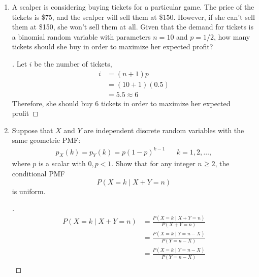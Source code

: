\documentclass[paper=usletter, fontsize=12pt]{article}
\begin{document}
\begin{enumerate}[label=\textbf{\arabic*}.]
\begin{enumerate}[label=(\alph*)]
        \end{enumerate}

        \item
        A scalper is considering buying tickets for a particular game. The
        price of the tickets is \$75, and the scalper will sell them at \$150.
        However, if she can't sell them at \$150, she won't sell them at all.
        Given that the demand for tickets is a binomial random variable with
        parameters $n=10$ and $p=1/2$, how many tickets should she buy in order
        to maximize her expected profit?
        \begin{proof}[\unskip\nopunct]
            Let $i$ be the number of tickets,
            \begin{align*}
                i & = (n+1)p \\
                & = (10 + 1)(0.5) \\
                & = 5.5 \approx 6
            \end{align*}
            Therefore, she should buy 6 tickets in order to maximize her
            expected profit \qedhere
        \end{proof}
        \vspace{0.2in}

        \item
        Suppose that $X$ and $Y$ are independent discrete random variables with
        the same geometric PMF:
        \begin{align*}
            p_X(k)=p_Y(k)=p(1-p)^{k-1}&& k=1,2,\ldots,
        \end{align*}
        where $p$ is a scalar with $0,p<1$. Show that for any integer $n \ge
        2$, the conditional PMF
        \begin{equation*}
            P(X=k \mid X+Y=n)
        \end{equation*}
        is uniform.
        \begin{proof}[\unskip\nopunct]
            \begingroup
            \addtolength{\jot}{1em}
            \begin{align*}
                P(X=k \mid X+Y=n) & = \frac{P(X=k \mid X+Y=n)}{P(X+Y=n)} \\
                & = \frac{P(X=k \mid Y=n-X)}{P(Y=n-X)}\\
                & = \frac{P(X=k \mid Y=n-X)}{P(Y=n-X)}\\
            \end{align*}
            \endgroup
        \end{proof}
        \vspace{0.2in}


\end{enumerate}
\end{document}
